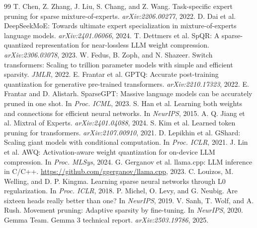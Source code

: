 \documentclass[10pt]{article}
\begin{document}

\begin{thebibliography}{99}
 T. Chen, Z. Zhang, J. Liu, S. Chang, and Z. Wang. Task-specific expert pruning for sparse mixture-of-experts. \textit{arXiv:2206.00277}, 2022.
 D. Dai et al. DeepSeekMoE: Towards ultimate expert specialization in mixture-of-experts language models. \textit{arXiv:2401.06066}, 2024.
 T. Dettmers et al. SpQR: A sparse-quantized representation for near-lossless LLM weight compression. \textit{arXiv:2306.03078}, 2023.
 W. Fedus, B. Zoph, and N. Shazeer. Switch transformers: Scaling to trillion parameter models with simple and efficient sparsity. \textit{JMLR}, 2022.
 E. Frantar et al. GPTQ: Accurate post-training quantization for generative pre-trained transformers. \textit{arXiv:2210.17323}, 2022.
 E. Frantar and D. Alistarh. SparseGPT: Massive language models can be accurately pruned in one shot. In \textit{Proc. ICML}, 2023.
 S. Han et al. Learning both weights and connections for efficient neural networks. In \textit{NeurIPS}, 2015.
 A. Q. Jiang et al. Mixtral of Experts. \textit{arXiv:2401.04088}, 2024.
 S. Kim et al. Learned token pruning for transformers. \textit{arXiv:2107.00910}, 2021.
 D. Lepikhin et al. GShard: Scaling giant models with conditional computation. In \textit{Proc. ICLR}, 2021.
 J. Lin et al. AWQ: Activation-aware weight quantization for on-device LLM compression. In \textit{Proc. MLSys}, 2024.
 G. Gerganov et al. llama.cpp: LLM inference in C/C++. \url{https://github.com/ggerganov/llama.cpp}, 2023.
 C. Louizos, M. Welling, and D. P. Kingma. Learning sparse neural networks through L0 regularization. In \textit{Proc. ICLR}, 2018.
 P. Michel, O. Levy, and G. Neubig. Are sixteen heads really better than one? In \textit{NeurIPS}, 2019.
 V. Sanh, T. Wolf, and A. Rush. Movement pruning: Adaptive sparsity by fine-tuning. In \textit{NeurIPS}, 2020.
 Gemma Team. Gemma 3 technical report. \textit{arXiv:2503.19786}, 2025.
\end{thebibliography}
\end{document}
